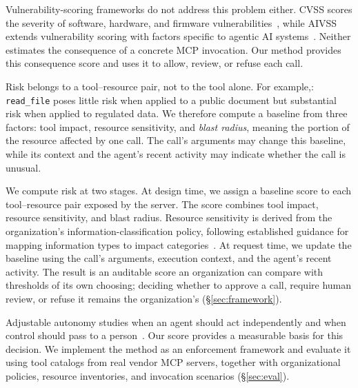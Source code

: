 \documentclass[sigconf]{acmart}
\begin{document}
Vulnerability-scoring frameworks do not address this problem either. CVSS
scores the severity of software, hardware, and firmware
vulnerabilities~\cite{first2023cvss}, while AIVSS extends vulnerability scoring
with factors specific to agentic AI systems~\cite{huang2026aivss}. Neither
estimates the consequence of a concrete MCP invocation. Our method provides
this consequence score and uses it to allow, review, or refuse each call.


Risk belongs to a tool--resource pair, not to the tool alone. For example,: \texttt{read\_file} poses little risk when applied to a public document but
substantial risk when applied to regulated data. We therefore compute a
baseline from three factors: tool impact, resource sensitivity, and
\emph{blast radius}, meaning the portion of the resource affected by one call.
The call's arguments may change this baseline, while its context and the
agent's recent activity may indicate whether the call is unusual.

We compute risk at two stages. At design time, we assign a baseline score to
each tool--resource pair exposed by the server. The score combines tool impact,
resource sensitivity, and blast radius. Resource sensitivity is derived from
the organization's information-classification policy, following established
guidance for mapping information types to impact
categories~\cite{nist2004fips199,nist2008sp80060}. At request time, we update
the baseline using the call's arguments, execution context, and the agent's
recent activity. The result is an auditable score an organization can compare
with thresholds of its own choosing; deciding whether to approve a call,
require human review, or refuse it remains the organization's
(\S\ref{sec:framework}).

Adjustable autonomy studies when an agent should act independently and when
control should pass to a person~\cite{pynadath2002adjustable}. Our score
provides a measurable basis for this decision. We implement the method as an
enforcement framework and evaluate it using tool catalogs from real vendor MCP
servers, together with organizational policies, resource inventories, and
invocation scenarios (\S\ref{sec:eval}).
\end{document}

